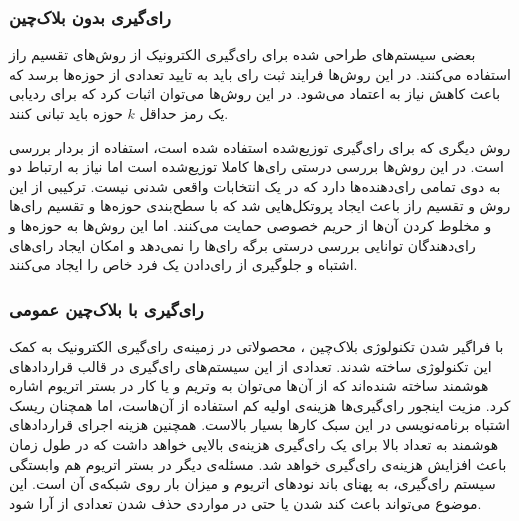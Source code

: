 \subsubsection{رای‌گیری بدون بلاک‌چین} 
بعضی سیستم‌های طراحی شده برای رای‌گیری الکترونیک
\cite{secret1}
\cite{secret2}
\cite{secret3}
 از روش‌های تقسیم راز
 استفاده می‌کنند. در این روش‌ها فرایند ثبت رای باید به تایید تعدادی از حوزه‌ها برسد که باعث کاهش نیاز به اعتماد می‌شود. در این روش‌ها می‌توان اثبات کرد که برای ردیابی یک رمز حداقل $k$ حوزه باید تبانی کنند. 
 \par
 روش دیگری که برای رای‌گیری توزیع‌شده استفاده شده است، استفاده از بردار‌ بررسی
 \cite{checkvector}
 است. در این روش‌ها بررسی درستی رای‌ها کاملا توزیع‌شده‌ است اما نیاز به ارتباط دو به دوی تمامی رای‌دهنده‌ها دارد که در یک انتخابات واقعی شدنی نیست. ترکیبی از این روش و تقسیم راز باعث ایجاد پروتکل‌هایی
 \cite{MPO1} \cite{evotinwocrypto}
  شد که با سطح‌بندی حوزه‌ها و تقسیم رای‌ها و مخلوط کردن آن‌ها از حریم خصوصی حمایت می‌کنند. اما این روش‌ها به حوزه‌ها و رای‌دهندگان توانایی بررسی درستی برگه رای‌ها را نمی‌دهد و امکان ایجاد رای‌های اشتباه و جلوگیری از رای‌دادن یک فرد خاص را ایجاد می‌کنند. 


\subsubsection{رای‌گیری با بلاک‌چین عمومی}
با فراگیر شدن تکنولوژی بلاک‌چین
\cite{rosgood}
، محصولاتی در زمینه‌ی رای‌گیری الکترونیک به کمک این تکنولوژی ساخته شدند. تعدادی از این سیستم‌های رای‌گیری در قالب قرارداد‌های هوشمند ساخته‌ شنده‌اند که از آن‌ها می‌توان به وتریم 
\cite{votereum}
و یا کار 
\cite{yavuz}
در بستر اتریوم اشاره کرد. مزیت اینجور رای‌گیری‌ها هزینه‌ی اولیه کم استفاده از آن‌هاست، اما همچنان ریسک اشتباه برنامه‌نویسی در این سبک کارها بسیار بالاست. همچنین هزینه اجرای قراردادهای هوشمند به تعداد بالا برای یک رای‌گیری هزینه‌ی بالایی خواهد داشت که در طول زمان باعث افزایش هزینه‌ی رای‌گیری خواهد شد. مسئله‌ی دیگر در بستر اتریوم هم وابستگی سیستم رای‌گیری، به پهنای باند نود‌های اتریوم و میزان بار روی شبکه‌ی آن است. این موضوع می‌تواند باعث کند شدن یا حتی در مواردی حذف شدن تعدادی از آرا شود.


